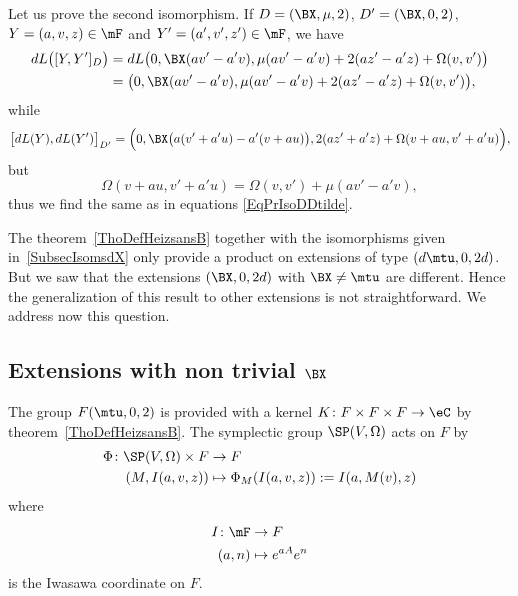 Let us prove the second isomorphism. If $D=(\BX ,\mu,2)$, $D'=(\BX ,0,2)$, $Y=(a,v,z)\in\mF$ and $Y'=(a',v',z')\in \mF$, we have
\begin{equation}   \label{EqPrIsoDDtilde}
	\begin{split}
		dL\big(  [Y,Y']_{D}  \big)&=dL\big(   0,\BX (av'-a'v),\mu(av'-a'v)+2(az'-a'z)+\Omega(v,v')     \big)\\
		&=\big(   0,\BX (av'-a'v),\mu(av'-a'v) +2(az'-a'z)+\Omega(v,v')  \big),
	\end{split}
\end{equation}
while
\[
	\big[ dL(Y),dL(Y')   \big]_{D'}=\Big(   0,\BX \big(  a(v'+a'u)-a'(v+au)   \big),2(az'+a'z)+\Omega(v+au,v'+a'u)    \Big),
\]
but
\[
	\Omega(v+au,v'+a'u)=\Omega(v,v')+\mu(av'-a'v),
\]
thus we find the same as in equations \eqref{EqPrIsoDDtilde}.

The theorem~\ref{ThoDefHeizsansB} together with the isomorphisms given in~\ref{SubsecIsomsdX} only provide a product on extensions of type $(d\mtu,0,2d)$. But we saw that the extensions $(\BX ,0,2d)$ with $\BX \neq\mtu$ are different. Hence the generalization of this result to other extensions is not straightforward. We address now this question.

\subsection{Extensions with non trivial \texorpdfstring{$\protect\BX $}{X}} \label{subsecTrick}

The group $F(\mtu,0,2)$ is provided with a kernel $K\colon F\times F\times F\to \eC$ by theorem~\ref{ThoDefHeizsansB}.  The symplectic group $\SP(V,\Omega)$ acts on $F$ by
\begin{equation}
	\begin{aligned}
		\Phi\colon \SP(V,\Omega)\times F & \to F                                   \\
		(M,I(a,v,z))                     & \mapsto \Phi_{M}(I(a,v,z)):=I(a,M(v),z)
	\end{aligned}
\end{equation}
where
\begin{equation}
	\begin{aligned}
		I\colon \mF & \to F                 \\
		(a,n)       & \mapsto  e^{aA} e^{n}
	\end{aligned}
\end{equation}
is the Iwasawa coordinate on $F$.

